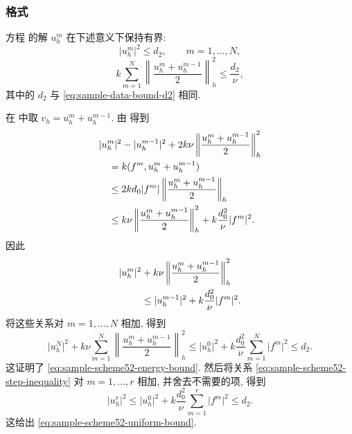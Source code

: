 \subsubsection{格式 }
\label{subsec:sample-scheme-52}

\begin{Lemma}
\label{lem:sample-scheme-52-bounds}
方程  的解 $u_h^m$ 在下述意义下保持有界:
\begin{equation}
  \lvert u_h^m\rvert^2 \leq d_2, \qquad m=1,\ldots,N,
  \label{eq:sample-scheme52-uniform-bound}
\end{equation}
\begin{equation}
  k\sum_{m=1}^{N}
  \left\lVert\frac{u_h^m+u_h^{m-1}}{2}\right\rVert_h^2
  \leq \frac{d_2}{\nu},
  \label{eq:sample-scheme52-energy-bound}
\end{equation}
其中的 $d_2$ 与 \eqref{eq:sample-data-bound-d2} 相同.
\end{Lemma}

\begin{Proof}
在  中取 $v_h=u_h^m+u_h^{m-1}$. 由  得到
\begin{align}
  &\lvert u_h^m\rvert^2-\lvert u_h^{m-1}\rvert^2
  +2k\nu\left\lVert\frac{u_h^m+u_h^{m-1}}{2}\right\rVert_h^2 \notag\\
  &\quad =k(f^m,u_h^m+u_h^{m-1}) \notag\\
  &\quad \leq 2kd_0\lvert f^m\rvert
  \left\lVert\frac{u_h^m+u_h^{m-1}}{2}\right\rVert_h \notag\\
  &\quad \leq k\nu\left\lVert\frac{u_h^m+u_h^{m-1}}{2}\right\rVert_h^2
  +k\frac{d_0^2}{\nu}\lvert f^m\rvert^2.
  \label{eq:sample-scheme52-test-identity}
\end{align}
因此
\begin{align}
  \lvert u_h^m\rvert^2
  &+k\nu\left\lVert\frac{u_h^m+u_h^{m-1}}{2}\right\rVert_h^2 \notag\\
  &\leq \lvert u_h^{m-1}\rvert^2
  +k\frac{d_0^2}{\nu}\lvert f^m\rvert^2.
  \label{eq:sample-scheme52-step-inequality}
\end{align}
将这些关系对 $m=1,\ldots,N$ 相加, 得到
\[
  \lvert u_h^N\rvert^2
  +k\nu\sum_{m=1}^{N}
  \left\lVert\frac{u_h^m+u_h^{m-1}}{2}\right\rVert_h^2
  \leq \lvert u_h^0\rvert^2
  +k\frac{d_0^2}{\nu}\sum_{m=1}^{N}\lvert f^m\rvert^2
  \leq d_2.
\]
这证明了 \eqref{eq:sample-scheme52-energy-bound}. 然后将关系 \eqref{eq:sample-scheme52-step-inequality} 对 $m=1,\ldots,r$ 相加, 并舍去不需要的项, 得到
\[
  \lvert u_h^r\rvert^2
  \leq \lvert u_h^0\rvert^2
  +k\frac{d_0^2}{\nu}\sum_{m=1}^{r}\lvert f^m\rvert^2
  \leq d_2.
\]
这给出 \eqref{eq:sample-scheme52-uniform-bound}.
\end{Proof}
